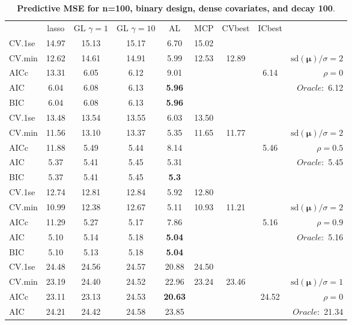 \clearpage
\begin{table}\vspace{-.5cm}
\caption[l]{ { \bf Predictive MSE for n=100, binary design, 
dense covariates, and  decay  100}.}
\vspace{-.5cm}
\footnotesize{}
\begin{center}
\begin{tabular}{l*{7}{c}|r}
 & lasso & GL $\gamma=1$ & GL $\gamma=10$ & AL & MCP  & CVbest & ICbest  \\
\cline{1-9}
CV.1se & 14.97 & 15.13 & 15.17 & 6.70 & 15.02 & & & \\
CV.min & 12.62 & 14.61 & 14.91 & 5.99 & 12.53 & 12.89 & & $\mathrm{sd}(\mathbf{\mu})/\sigma=2$ \\
AICc & 13.31 & 6.05 & 6.12 & 9.01 & & & 6.14 &  $\rho=0$ \\
AIC & 6.04 & 6.08 & 6.13 & {\bf 5.96} & & & &  \multirow{2}{*}{$Oracle: $ 6.12} \\
BIC & 6.04 & 6.08 & 6.13 & {\bf 5.96} & & & &  \\
 \hline 
CV.1se & 13.48 & 13.54 & 13.55 & 6.03 & 13.50 & & & \\
CV.min & 11.56 & 13.10 & 13.37 & 5.35 & 11.65 & 11.77 & & $\mathrm{sd}(\mathbf{\mu})/\sigma=2$ \\
AICc & 11.88 & 5.49 & 5.44 & 8.14 & & & 5.46 &  $\rho=0.5$ \\
AIC & 5.37 & 5.41 & 5.45 & 5.31 & & & &  \multirow{2}{*}{$Oracle: $ 5.45} \\
BIC & 5.37 & 5.41 & 5.45 & {\bf 5.3} & & & &  \\
 \hline 
CV.1se & 12.74 & 12.81 & 12.84 & 5.92 & 12.80 & & & \\
CV.min & 10.99 & 12.38 & 12.67 & 5.11 & 10.93 & 11.21 & & $\mathrm{sd}(\mathbf{\mu})/\sigma=2$ \\
AICc & 11.29 & 5.27 & 5.17 & 7.86 & & & 5.16 &  $\rho=0.9$ \\
AIC & 5.10 & 5.14 & 5.18 & {\bf 5.04} & & & &  \multirow{2}{*}{$Oracle: $ 5.16} \\
BIC & 5.10 & 5.13 & 5.18 & {\bf 5.04} & & & &  \\
 \hline 
CV.1se & 24.48 & 24.56 & 24.57 & 20.88 & 24.50 & & & \\
CV.min & 23.19 & 24.40 & 24.52 & 22.96 & 23.24 & 23.46 & & $\mathrm{sd}(\mathbf{\mu})/\sigma=1$ \\
AICc & 23.11 & 23.13 & 24.53 & {\bf 20.63} & & & 24.52 &  $\rho=0$ \\
AIC & 24.21 & 24.42 & 24.58 & 23.85 & & & &  \multirow{2}{*}{$Oracle: $ 21.34} \\

\end{tabular}
\end{center}
\end{table}
